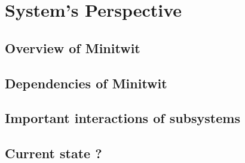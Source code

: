 \section{System's Perspective}
\subsection{Overview of Minitwit}
\subsection{Dependencies of Minitwit}
\subsection{Important interactions of subsystems}
\subsection{Current state ?}